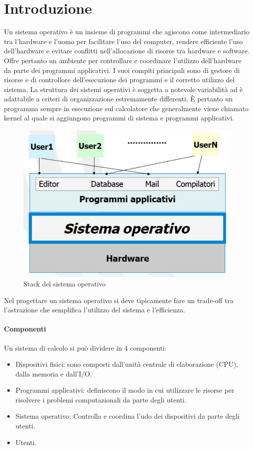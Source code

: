 \chapter{Introduzione}
Un sistema operativo \`e un insieme di programmi che agiscono come intermediario tra l'hardware e l'uomo per facilitare l'uso del computer, rendere efficiente l'uso dell'hardware e evitare conflitti 
nell'allocazione di risorse tra hardware e software. Offre pertanto un ambiente per controllare e coordinare l'utilizzo dell'hardware da parte dei programmi applicativi. I suoi compiti principali sono di gestore di
risorse e di controllore dell'esecuzione dei programmi e il corretto utilizzo del sistema. La struttura dei sistemi operativi \`e soggetta a notevole variabilit\`a ad \`e adattabile a criteri di organizzazione estremamente differenti.
\`E pertanto un programma sempre in esecuzione sul calcolatore che generalmente viene chiamato kernel al quale si aggiungono programmi di sistema e programmi applicativi.
\begin{figure}[h]
\includegraphics[width=\textwidth]{Pictures/StackSistemaOperativo.png}
\caption{Stack del sistema operativo}
\end{figure}
Nel progettare un sistema operativo si deve tipicamente fare un trade-off tra l'astrazione che semplifica l'utilizzo del sistema e l'efficienza.
\subsubsection{Componenti}
Un sistema di calcolo si pu\`o dividere in $4$ componenti:
\begin{itemize}
	\item Dispositivi fisici: sono composti dall'unit\`a centrale di elaborazione (CPU), dalla memoria e dall'I/O.
	\item Programmi applicativi: definiscono il modo in cui utilizzare le risorse per risolvere i problemi computazionali da parte degli utenti.
	\item Sistema operativo: Controlla e coordina l'udo dei dispositivi da parte degli utenti.
	\item Utenti.
\end{itemize}

